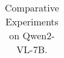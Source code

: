\begin{table}[!h]
{{\begin{tabular}{p{2.35cm} | c c c c c c c | >{\centering\arraybackslash}p{2.0cm}}
        \bottomrule[1.5pt]
	\end{tabular}}}
    \vspace{-3mm}
	\caption{Comparative Experiments on Qwen2-VL-7B.}
    \vspace{-4mm}
    \label{app_tab:qwen2vl}
 
\end{table}